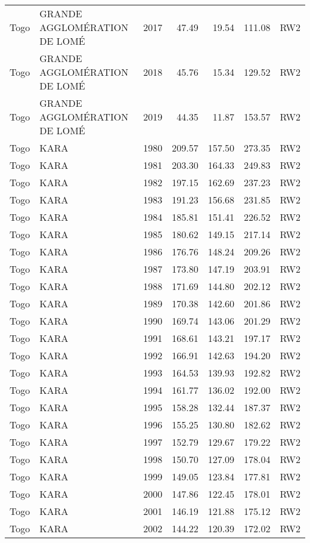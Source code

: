 \begin{longtable}{lllrrrl}
  Togo & GRANDE AGGLOMÉRATION DE LOMÉ & 2017 & 47.49 & 19.54 & 111.08 & RW2 \\ 
  Togo & GRANDE AGGLOMÉRATION DE LOMÉ & 2018 & 45.76 & 15.34 & 129.52 & RW2 \\ 
  Togo & GRANDE AGGLOMÉRATION DE LOMÉ & 2019 & 44.35 & 11.87 & 153.57 & RW2 \\ 
  Togo & KARA & 1980 & 209.57 & 157.50 & 273.35 & RW2 \\ 
  Togo & KARA & 1981 & 203.30 & 164.33 & 249.83 & RW2 \\ 
  Togo & KARA & 1982 & 197.15 & 162.69 & 237.23 & RW2 \\ 
  Togo & KARA & 1983 & 191.23 & 156.68 & 231.85 & RW2 \\ 
  Togo & KARA & 1984 & 185.81 & 151.41 & 226.52 & RW2 \\ 
  Togo & KARA & 1985 & 180.62 & 149.15 & 217.14 & RW2 \\ 
  Togo & KARA & 1986 & 176.76 & 148.24 & 209.26 & RW2 \\ 
  Togo & KARA & 1987 & 173.80 & 147.19 & 203.91 & RW2 \\ 
  Togo & KARA & 1988 & 171.69 & 144.80 & 202.12 & RW2 \\ 
  Togo & KARA & 1989 & 170.38 & 142.60 & 201.86 & RW2 \\ 
  Togo & KARA & 1990 & 169.74 & 143.06 & 201.29 & RW2 \\ 
  Togo & KARA & 1991 & 168.61 & 143.21 & 197.17 & RW2 \\ 
  Togo & KARA & 1992 & 166.91 & 142.63 & 194.20 & RW2 \\ 
  Togo & KARA & 1993 & 164.53 & 139.93 & 192.82 & RW2 \\ 
  Togo & KARA & 1994 & 161.77 & 136.02 & 192.00 & RW2 \\ 
  Togo & KARA & 1995 & 158.28 & 132.44 & 187.37 & RW2 \\ 
  Togo & KARA & 1996 & 155.25 & 130.80 & 182.62 & RW2 \\ 
  Togo & KARA & 1997 & 152.79 & 129.67 & 179.22 & RW2 \\ 
  Togo & KARA & 1998 & 150.70 & 127.09 & 178.04 & RW2 \\ 
  Togo & KARA & 1999 & 149.05 & 123.84 & 177.81 & RW2 \\ 
  Togo & KARA & 2000 & 147.86 & 122.45 & 178.01 & RW2 \\ 
  Togo & KARA & 2001 & 146.19 & 121.88 & 175.12 & RW2 \\ 
  Togo & KARA & 2002 & 144.22 & 120.39 & 172.02 & RW2 \\ 

\end{longtable}
